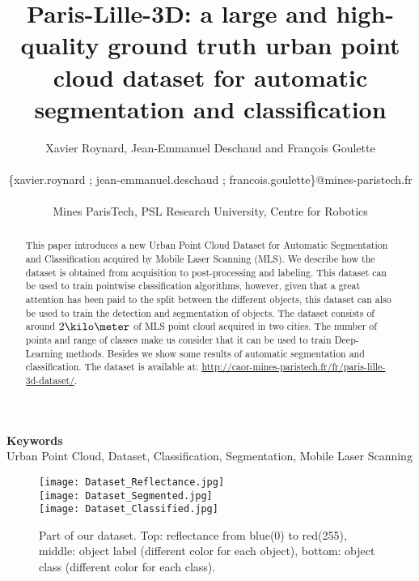 \documentclass[a4paper, 10pt, journal]{article}
\begin{document}
\title{Paris-Lille-3D: a large and high-quality ground truth urban point cloud
dataset for automatic segmentation and classification}

\author{\hspace{-1.5cm} Xavier Roynard, Jean-Emmanuel Deschaud and François Goulette\\ %
 \\
 \hspace{-1.0cm}\{xavier.roynard ; jean-emmanuel.deschaud ; francois.goulette\}@mines-paristech.fr
 \\ %
 \\
\hspace{-1.2cm}Mines ParisTech, PSL Research University, Centre for Robotics}

\date{}

\maketitle

\begin{abstract}
This paper introduces a new Urban Point Cloud Dataset for Automatic Segmentation and Classification acquired by Mobile Laser Scanning (MLS). We describe how the dataset is obtained from acquisition to post-processing and labeling. This dataset can be used to train pointwise classification algorithms, however, given that a great attention has been paid to the split between the different objects, this dataset can also be used to train the detection and segmentation of objects.
The dataset consists of around $2\kilo\meter$ of MLS point cloud acquired in two cities. The number of points and range of classes make us consider that it can be used to train Deep-Learning methods.
Besides we show some results of automatic segmentation and classification. %
The dataset is available at: \href{http://caor-mines-paristech.fr/fr/paris-lille-3d-dataset/}{http://caor-mines-paristech.fr/fr/paris-lille-3d-dataset/}.
\end{abstract}

\begin{center}
 \textbf{\small Keywords} \\ Urban Point Cloud, Dataset, Classification, Segmentation, Mobile Laser Scanning
\end{center}

\begin{figure}\centering
 \texttt{[image: Dataset\_Reflectance.jpg]}\\
 \texttt{[image: Dataset\_Segmented.jpg]}\\
 \texttt{[image: Dataset\_Classified.jpg]}
 \caption{Part of our dataset. Top: reflectance from blue(0) to red(255), middle: object label (different color for each object), bottom: object  class (different color for each class). \label{fig:dataset}}
\end{figure}
\end{document}
